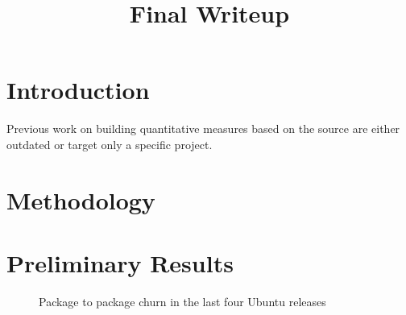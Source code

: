 \documentclass[11pt]{article}
\title{Final Writeup}
\date{}
\author{}
\begin{document}
\maketitle
\thispagestyle{fancy}

\section{Introduction}

Previous work on building quantitative measures based on the source are either outdated\cite{sloccount} or target only a specific project\cite{lwnstats,gnomecensus}.

\section{Methodology}

\section{Preliminary Results}

\begin{figure}[htb]
  \begin{center}
  \end{center}
  \caption{Package to package churn in the last four Ubuntu releases}
  \label{fig:churn}
\end{figure}
\end{document}
